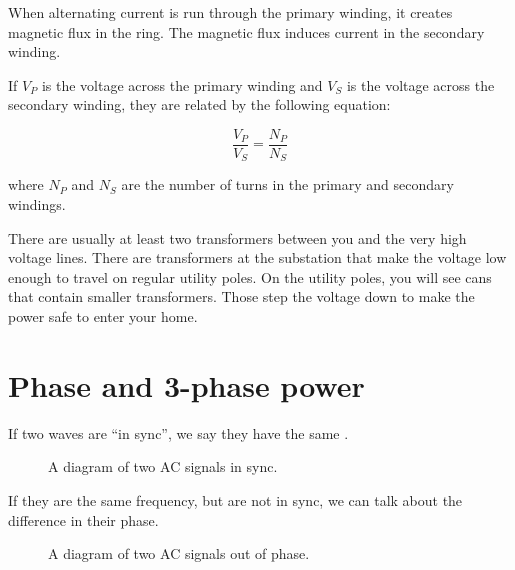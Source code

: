 When alternating current is run through the primary winding, it creates magnetic
flux in the ring. The magnetic flux induces current in the secondary
winding.

If $V_P$ is the voltage across the primary winding and $V_S$ is the
voltage across the secondary winding, they are related by the
following equation:

$$\frac{V_P}{V_S} = \frac{N_P}{N_S}$$

where $N_P$ and $N_S$ are the number of turns in the primary and
secondary windings.

There are usually at least two transformers between you and the very
high voltage lines. There are transformers at the substation that make
the voltage low enough to travel on regular utility poles. On the
utility poles, you will see cans that contain smaller
transformers. Those step the voltage down to make the power safe to
enter your home.

\section{Phase and 3-phase power}
If two waves are ``in sync'', we say they have the same .
\begin{figure}[htbp]
    \centering
    \caption{A diagram of two AC signals in sync.}
    \label{fig:ACsync}
\end{figure}

If they are the same frequency, but are not in sync, we can talk about
the difference in their phase.
\begin{figure}[htbp]
    \centering
    \caption{A diagram of two AC signals out of phase.}
    \label{fig:ACoutsync}
\end{figure}

